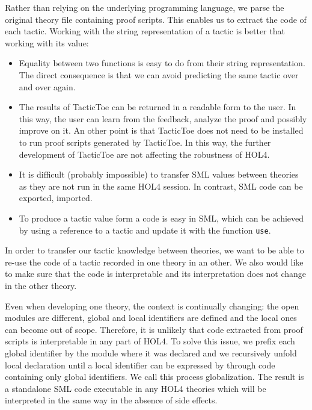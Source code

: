 \documentclass[runningheads,a4paper,draft]{svjour3}
\def\holfour{\textsf{HOL4}\xspace}
\def\sml{\textsf{SML}\xspace}
\def\tactictoe{\textsf{TacticToe}\xspace}
\begin{document}

Rather than relying on the underlying programming language, we parse the
original theory file containing proof scripts. This enables us to extract the 
code of each tactic. 
Working with the string representation of a tactic is better that working with 
its value:
\begin{itemize}
\item Equality between two functions is easy to do from 
their string representation. The direct consequence is that we can avoid 
predicting the same tactic over and over again. 
\item 
The 
results of 
\tactictoe can be returned in a readable form to the user. In this way, the 
user can learn from the feedback, analyze the proof and possibly improve on it.
An other point is that \tactictoe does not need to be installed to run  
proof scripts generated by \tactictoe. In this way, the further development of 
\tactictoe are not affecting the robustness of \holfour.
\item
It is difficult (probably impossible) to transfer \sml values 
between theories as they are not run in the same \holfour session. In contrast, 
\sml code can be exported, imported.
\item To produce a tactic value form a code is easy in \sml, which can be 
achieved by using a reference to a tactic and update it with the function 
\texttt{use}.
\end{itemize} 

In order to transfer our tactic knowledge between theories, we want to be able 
to re-use the code of a tactic recorded in one theory in an 
other. We also would like to make sure that the code is interpretable and its 
interpretation does not change in the other theory.

Even when developing one theory, the context is continually changing: the open 
modules are different, global and local identifiers are defined and the local 
ones can become out of scope. Therefore, it is unlikely that code extracted 
from proof scripts is interpretable in any part of \holfour.
To solve this issue, we prefix each global identifier by the module where it 
was declared and we recursively unfold local declaration until a local 
identifier can be expressed by through code containing only global identifiers.
We call this process globalization. The result is a standalone \sml code 
executable in any \holfour theories which will be interpreted in the same way 
in the absence 
of side effects.
\end{document}
